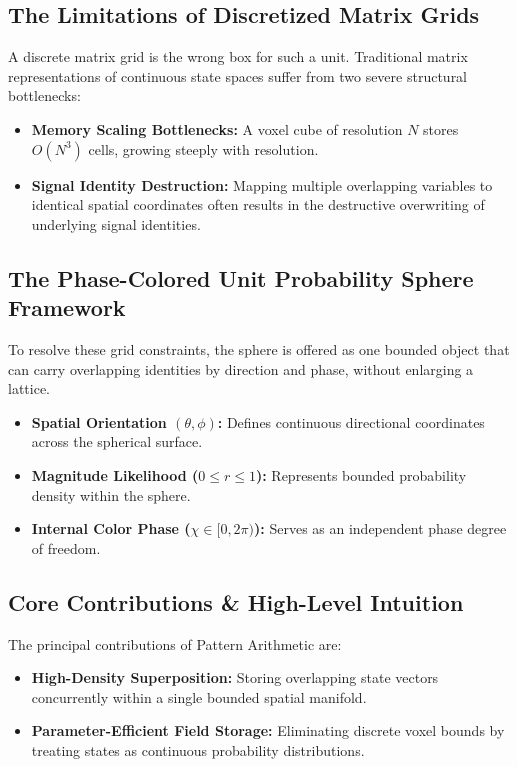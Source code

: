 \documentclass[12pt, a4paper]{article}
\begin{document}
\subsection{The Limitations of Discretized Matrix Grids}
A discrete matrix grid is the wrong box for such a unit. Traditional matrix representations of continuous state spaces suffer from two severe structural bottlenecks:
\begin{itemize}
    \item \textbf{Memory Scaling Bottlenecks:} A voxel cube of resolution $N$ stores $O(N^3)$ cells, growing steeply with resolution.
    \item \textbf{Signal Identity Destruction:} Mapping multiple overlapping variables to identical spatial coordinates often results in the destructive overwriting of underlying signal identities.
\end{itemize}

\subsection{The Phase-Colored Unit Probability Sphere Framework}
To resolve these grid constraints, the sphere is offered as one bounded object that can carry overlapping identities by direction and phase, without enlarging a lattice.
\begin{itemize}
    \item \textbf{Spatial Orientation $(\theta, \phi)$:} Defines continuous directional coordinates across the spherical surface.
    \item \textbf{Magnitude Likelihood ($0 \leq r \leq 1$):} Represents bounded probability density within the sphere.
    \item \textbf{Internal Color Phase ($\chi \in [0, 2\pi)$):} Serves as an independent phase degree of freedom.
\end{itemize}

\subsection{Core Contributions \& High-Level Intuition}
The principal contributions of Pattern Arithmetic are:
\begin{itemize}
    \item \textbf{High-Density Superposition:} Storing overlapping state vectors concurrently within a single bounded spatial manifold.
    \item \textbf{Parameter-Efficient Field Storage:} Eliminating discrete voxel bounds by treating states as continuous probability distributions.
\end{itemize}
\end{document}
